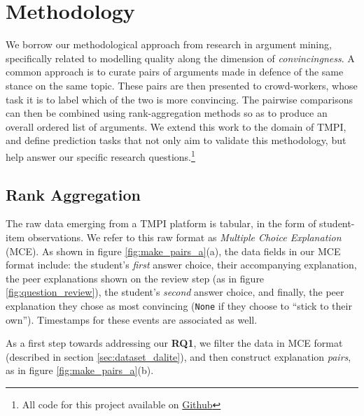 \documentclass[notitlepage,12pt]{jedm}
\begin{document}
\section{Methodology}\label{sec:methodology}

We borrow our methodological approach from research in argument mining, 
specifically related to modelling quality along the dimension of 
\textit{convincingness}.
A common approach is to curate pairs of arguments made in defence of the same 
stance on the same topic.
These pairs are then presented to crowd-workers, whose task it is to label  
which of the two is more convincing. 
The pairwise comparisons can then be combined using rank-aggregation methods so 
as to produce an overall ordered list of arguments.
We extend this work to the domain of TMPI, and define prediction tasks that not 
only aim to validate this methodology, but help answer our specific research 
questions.\footnote{All code for this project available on 
\href{https://github.com/sameerbhatnagar/convincingness}{Github}}

\subsection{Rank Aggregation}\label{sec:rank_agg}
The raw data emerging from a TMPI platform is tabular, in the form of 
student-item observations.
We refer to this raw format as \textit{Multiple Choice Explanation} (MCE).
As shown in figure \ref{fig:make_pairs_a}(a), the data fields in our MCE format 
include: the student's \textit{first} answer choice, their 
accompanying explanation, the peer explanations shown on the review step (as in 
figure \ref{fig:question_review}), the student's \textit{second} answer choice, 
and finally, the peer explanation they chose as most convincing (\verb|None| if 
they choose to ``stick to their own'').
Timestamps for these events are associated as well.

As a first step towards addressing our \textbf{RQ1}, we filter the data in MCE 
format (described in section \ref{sec:dataset_dalite}), and then construct 
explanation \textit{pairs}, as in figure \ref{fig:make_pairs_a}(b).
\end{document}

